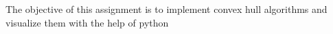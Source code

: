 The objective of this assignment is to implement convex hull algorithms and visualize them with the help of python 